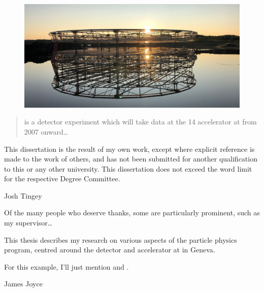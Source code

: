 
\begin{figure}
    \includegraphics[width=\largefigwidth]{diagrams/4-chips/sunrise}
\end{figure}

\begin{abstract}%
    \LHCb is a \bphysics detector experiment which will take data at
    the \unit{14}{\TeV} \LHC accelerator at \CERN from 2007 onward\dots
\end{abstract}


\begin{declaration}
    This dissertation is the result of my own work, except where explicit
    reference is made to the work of others, and has not been submitted
    for another qualification to this or any other university. This
    dissertation does not exceed the word limit for the respective Degree
    Committee.
    \vspace*{1cm}
    \begin{flushright}
        Josh Tingey
    \end{flushright}
\end{declaration}


\begin{acknowledgements}
    Of the many people who deserve thanks, some are particularly prominent,
    such as my supervisor\dots
\end{acknowledgements}


\begin{preface}
    This thesis describes my research on various aspects of the \LHCb
    particle physics program, centred around the \LHCb detector and \LHC
    accelerator at \CERN in Geneva.

    \noindent
    For this example, I'll just mention 
    and .
\end{preface}

\tableofcontents

%
{James Joyce}
\thispagestyle{empty}
